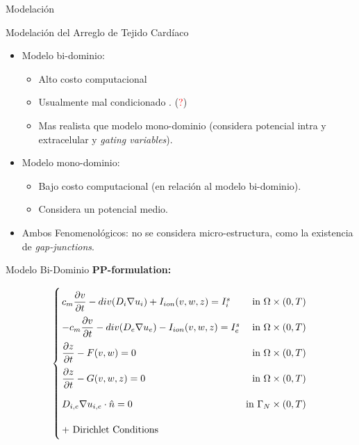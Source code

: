 \documentclass[11pt,spanish]{beamer}
\newcommand{\red}{\textcolor{red}}
\begin{document}
\begin{frame}
\begin{center}
\Huge Modelación
\end{center}
\end{frame}

\begin{frame}{Modelación del Arreglo de Tejido Cardíaco}
\begin{itemize}
\item Modelo bi-dominio: 
\begin{itemize}
\item Alto costo computacional
\item Usualmente mal condicionado \cite{colli_franzone}. (\red{?})
\item Mas realista que modelo mono-dominio (considera potencial intra y extracelular y \textsl{gating variables}).
\end{itemize}
\pause
\item Modelo mono-dominio:
\begin{itemize}
\item Bajo costo computacional (en relación al modelo bi-dominio).
\item Considera un potencial medio.
\end{itemize}
\item Ambos Fenomenológicos: no se considera micro-estructura, como la existencia de \textsl{gap-junctions}.
\end{itemize}
\end{frame}


\begin{frame}{Modelo Bi-Dominio}
\textbf{PP-formulation:} 

\begin{equation}
\arraycolsep=1.4pt\def\arraystretch{2.2}
\left\lbrace
\begin{array}{lr}
c_m \dfrac{\partial v}{\partial t} - div(D_i \nabla u_i) + I_{ion}(v,w,z) = I_{i}^s & \text{ in } \Omega \times (0,T) \\
-c_m \dfrac{\partial v}{\partial t } - div(D_e \nabla u_e) - I_{ion}(v,w,z) = I_e^s & \text{ in }\Omega \times (0,T) \\
\dfrac{\partial z}{\partial t} - F(v,w) = 0 & \text{ in }\Omega \times (0,T) \\
\dfrac{\partial z}{\partial t } - G(v,w,z) = 0  & \text{ in }\Omega \times (0,T) \\
D_{i,e}  \nabla u_{i,e} \cdot \hat{n} = 0 & \text{ in } \Gamma_N \times (0,T) \\
+ \text{ Dirichlet Conditions }
\end{array}
\right.  \label{eq:BDM}
\end{equation}
\end{frame}
\end{document}
